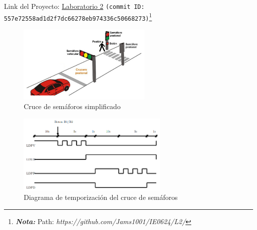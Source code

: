 \begin{abstract}
   En este laboratorio se desarrolló un cruce de semáforo simplificado, conformado por un par de semáforos peatonales y uno vehicular, como se puede observar en la figura \ref{cruce_semaforos}. Dicho sistema debía replicar el comportamiento mostrado en la figura \ref{diagrama_temporizacion} para validar su funcionamiento. Para ello se implementó una máquina de estados a través de un microcontrolador ATtiny4313. Dicha máquina se diseñó con 5 entradas, conformadas por 2 pulsadores, 2 temporizadores y un contador. Además cuenta con 4 salidas que representan las luces de los semáforos, y posee un total de 8 estados. Por lo tanto, la máquina requiere de 2 bits de entrada, ya que únicamente los pulsadores constituyen entradas externas del sistema. Añadido a esto, la máquina necesita 3 bits para disponer de 8 combinaciones distintas que identifiquen cada estado. 
   
   \vspace{0.25cm}
   
   Por otro lado, el circuito diseñado para este laboratorio tiene una serie de leds que representan las luces de los semáforos, cada uno acompañado por una resistencia de protección. El circuito también cuenta con un filtro pasivo hecho con una resistencia y un capacitor. Dicho filtro se agregó con el fin de eliminar el factor del ``bouncing'' de los pulsadores.
\end{abstract}

Link del Proyecto: \faGithub   \hspace{0.5mm}\href{https://github.com/Jams1001/IE0624}{Laboratorio 2} \texttt{(commit ID: 557e72558ad1d2f7dc66278eb974336c50668273)}\footnote{\textbf{\textit{Nota: }}Path: \textit{https://github.com/Jams1001/IE0624/L2/}}

\begin{figure}[H]
    \centering
    \includegraphics[width=0.575\textwidth]{images/cruce_semaforos.png}
    \caption{Cruce de semáforos simplificado}
    \label{cruce_semaforos}
\end{figure}

\begin{figure}[H]
    \centering
    \includegraphics[width=0.65\textwidth]{images/diagrama_temporizacion.png}
    \caption{Diagrama de temporización del cruce de semáforos}
    \label{diagrama_temporizacion}
\end{figure}